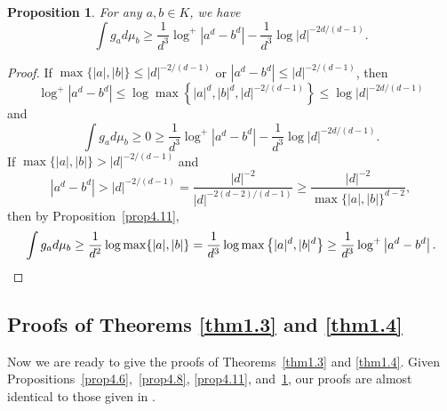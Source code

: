 \documentclass[11pt]{amsart}
\numberwithin{equation}{section}
\theoremstyle{plain}
\newtheorem{prop}[thm]{Proposition}
\theoremstyle{definition}
\theoremstyle{remark}
\begin{document}
\begin{prop}\label{prop4.12}
For any $a,b\in K$, we have
\[
\int g_{a}d\mu_{b}\geq\frac{1}{d^{3}}\log^{+}\left|a^{d}-b^{d}\right|-\frac{1}{d^{3}}\log|d|^{-2d/(d-1)}.
\]
\end{prop}

\begin{proof}
If $\max\{|a|,|b|\}\leq|d|^{-2/(d-1)}$ or $|a^{d}-b^{d}|\leq|d|^{-2/(d-1)}$,
then
\[
\log^{+}\left|a^{d}-b^{d}\right|\leq\log\max\left\{|a|^{d},|b|^{d},|d|^{-2/(d-1)}\right\}\leq\log|d|^{-2d/(d-1)}
\]
and
\[
\int g_{a}d\mu_{b}\geq0\geq\frac{1}{d^{3}}\log^{+}\left|a^{d}-b^{d}\right|-\frac{1}{d^{3}}\log|d|^{-2d/(d-1)}.
\]
If $\max\{|a|,|b|\}>|d|^{-2/(d-1)}$ and
\[
\left|a^{d}-b^{d}\right|>|d|^{-2/(d-1)}=\frac{|d|^{-2}}{|d|^{-2(d-2)/(d-1)}}\geq\frac{|d|^{-2}}{\max\{|a|,|b|\}^{d-2}},
\]
then by Proposition~\ref{prop4.11},
\[
\int g_{a}d\mu_{b}\geq\frac{1}{d^{2}}\log\max\{|a|,|b|\}=\frac{1}{d^{3}}\log\max\left\{|a|^{d},|b|^{d}\right\}\geq\frac{1}{d^{3}}\log^{+}\left|a^{d}-b^{d}\right|.\qedhere
\]
\end{proof}

\subsection{Proofs of Theorems \texorpdfstring{\ref{thm1.3}}{1.3}
and \texorpdfstring{\ref{thm1.4}}{1.4}}\label{sec4.5}

Now we are ready to give the proofs of Theorems~\ref{thm1.3} and
\ref{thm1.4}. Given Propositions~\ref{prop4.6},~\ref{prop4.8},
\ref{prop4.11}, and~\ref{prop4.12}, our proofs are almost identical
to those given in \cite[Sections 7 and 8]{DKY2}.
\end{document}
